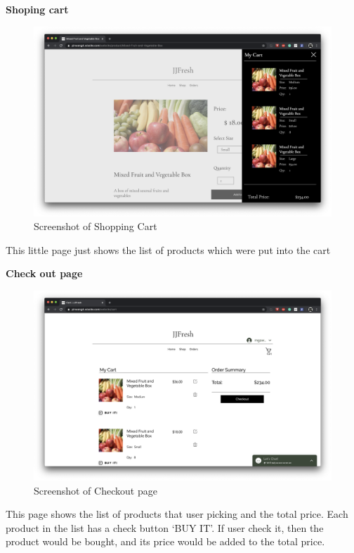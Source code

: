 \clearpage
\textbf{Shoping cart}
\begin{figure}[htp]
\centering
\includegraphics[width=\textwidth]{Figures/shoppingCart.png}
\caption{Screenshot of Shopping Cart}
\label{fig:shoppingCart}
\end{figure}

This little page just shows the list of products which were put into the cart

\clearpage
\textbf{Check out page}
\begin{figure}[htp]
\centering
\includegraphics[width=\textwidth]{Figures/checkoutPage.png}
\caption{Screenshot of Checkout page}
\label{fig:checkoutPage}
\end{figure}

This page shows the list of products that user picking and the total price. Each product in the list has a check button ‘BUY IT’. If user check it, then the product would be bought, and its price would be added to the total price.

